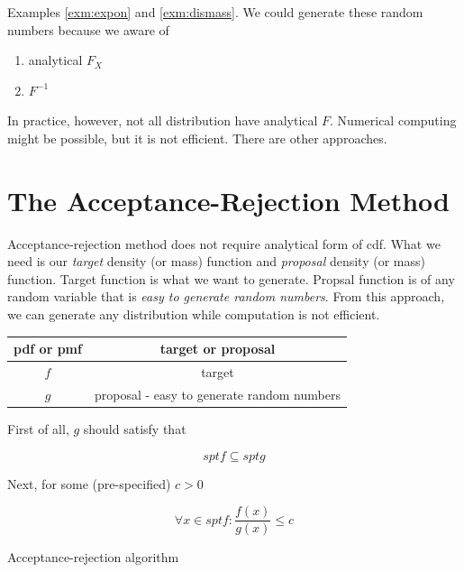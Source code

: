 \documentclass[]{book}
\providecommand{\tightlist}{%
  \setlength{\itemsep}{0pt}\setlength{\parskip}{0pt}}
\theoremstyle{definition}
\theoremstyle{definition}
\theoremstyle{definition}
\theoremstyle{remark}
\begin{document}
Examples \ref{exm:expon} and \ref{exm:dismass}. We could generate these random numbers because we aware of

\begin{enumerate}
\def\labelenumi{\arabic{enumi}.}
\tightlist
\item
  analytical \(F_X\)
\item
  \(F^{-1}\)
\end{enumerate}

In practice, however, not all distribution have analytical \(F\). Numerical computing might be possible, but it is not efficient. There are other approaches.

\hypertarget{the-acceptance-rejection-method}{%
\section{The Acceptance-Rejection Method}\label{the-acceptance-rejection-method}}

Acceptance-rejection method does not require analytical form of cdf. What we need is our \emph{target} density (or mass) function and \emph{proposal} density (or mass) function. Target function is what we want to generate. Propsal function is of any random variable that is \emph{easy to generate random numbers}. From this approach, we can generate any distribution while computation is not efficient.

\begin{longtable}[]{@{}cc@{}}
\toprule
pdf or pmf & target or proposal\tabularnewline
\midrule
\endhead
\(f\) & target\tabularnewline
\(g\) & proposal - easy to generate random numbers\tabularnewline
\bottomrule
\end{longtable}

First of all, \(g\) should satisfy that

\[spt f \subseteq spt g\]

Next, for some (pre-specified) \(c > 0\)

\[\forall x \in spt f : \frac{f(x)}{g(x)} \le c\]

\begin{algorithm}[H] \label{alg:algar}
  \SetAlgoLined
  \caption{Acceptance-rejection algorithm}
\end{algorithm}
\end{document}

